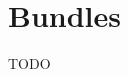 \documentclass[FIPLY_base.tex]{subfiles}
\author{Andreas Denkmayr}
\date{25. Februar 2016}
\begin{document}
\section{Bundles}
TODO
\end{document}

